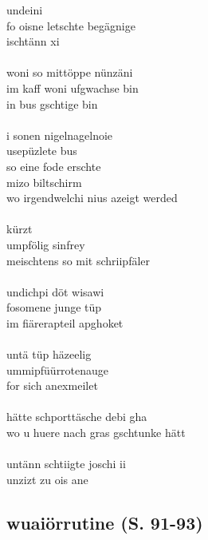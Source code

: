 \documentclass[a4paper,11pt]{scrartcl}
\begin{document}
\begin{multicols}{2}
\noindent
undeini\\
fo oisne letschte begägnige\\
ischtänn xi\\
\\
woni so mittöppe nünzäni\\
im kaff woni ufgwachse bin\\
in bus gschtige bin\\
\\
i sonen nigelnagelnoie\\
usepüzlete bus\\
so eine fode erschte\\
mizo biltschirm\\
wo irgendwelchi nius azeigt werded\\
\\
kürzt\\
umpfölig sinfrey\\
meischtens so mit schriipfäler\\
\\
undichpi döt wisawi\\
fosomene junge tüp\\
im fiärerapteil apghoket\\
\\
untä tüp häzeelig\\
ummipfüürrotenauge\\
for sich anexmeilet\\
\\
hätte schporttäsche debi gha\\
wo u huere nach gras gschtunke hätt\\
\\
untänn schtiigte joschi ii\\
unzizt zu ois ane
\end{multicols}

\subsection*{wuaiörrutine (S. 91-93)}
\end{document}
